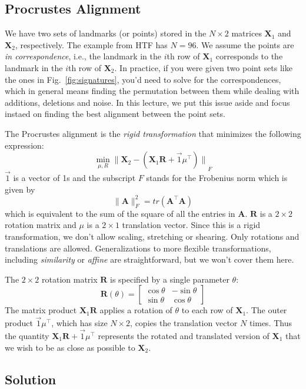 \documentclass[a4paper]{article}
\begin{document}
\subsection{Procrustes Alignment}
We have two sets of landmarks (or points) stored in the $N \times 2$ matrices $\mathbf{X}_1$ and $\mathbf{X}_2$, respectively.  The example from HTF has $N=96$.  We assume the points are \emph{in correspondence}, i.e., the landmark in the $i$th row of $\mathbf{X}_1$ corresponds to the landmark in the $i$th row of $\mathbf{X}_2$. In practice, if you were given two point sets like the ones in Fig.~\ref{fig:signatures}, you'd need to solve for the correspondences, which in general means finding the permutation between them while dealing with additions, deletions and noise.  In this lecture, we put this issue aside and focus instaed on finding the best alignment between the point sets.

The Procrustes alignment is the \emph{rigid transformation} that minimizes the following expression:
$$
\underset{\mu, R}{\min} {\|\mathbf{X}_2 - (\mathbf{X}_1\mathbf{R} + \vec{1}\mu^\top) \|}_F
$$
$\vec{1}$ is a vector of 1s and the subscript $F$ stands for the Frobenius norm which is given by
$$
\|\mathbf{A}\|^2_F = tr(\mathbf{A}^{\top} \mathbf{A})
$$
which is equivalent to the sum of the square of all the entries in $\mathbf{A}$.  $\mathbf{R}$ is a $2 \times 2$ rotation matrix and $\mu$ is a $2 \times 1$ translation vector. Since this is a rigid transformation, we don't allow scaling, stretching or shearing.  Only rotations and translations are allowed. Generalizations to more flexible transformations, including \emph{similarity} or \emph{affine} are straightforward, but we won't cover them here.

The $2\times 2$ rotation matrix $\mathbf{R}$ is specified by a single parameter $\theta$:
$$
\mathbf{R}(\theta) = \begin{bmatrix} {\cos\theta} & {-\sin\theta} \\ {\sin\theta} & {\cos\theta} \end{bmatrix}
$$
The matrix product $\mathbf{X}_1\mathbf{R}$ applies a rotation of $\theta$ to each row of $\mathbf{X}_1$.  The outer product
 $\vec{1}\mu^\top$, which has size $N\times 2$, copies the translation vector $N$ times.  Thus the quantity $\mathbf{X}_1\mathbf{R} + \vec{1}\mu^\top$ represents the rotated and translated version of $\mathbf{X}_1$ that we wish to be as close as possible to $\mathbf{X}_2$.

\subsection{Solution}
\end{document}
